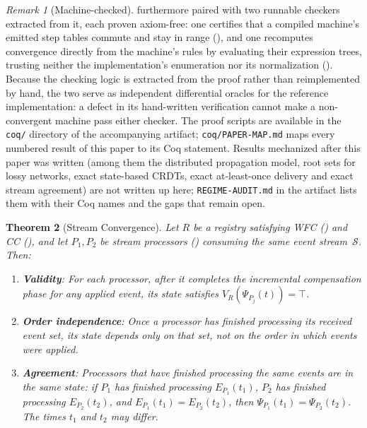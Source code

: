 \documentclass[11pt,a4paper]{article}
\theoremstyle{plain}
\newtheorem{theorem}{Theorem}[section]
\theoremstyle{definition}
\theoremstyle{remark}
\newtheorem{remark}[theorem]{Remark}
\begin{document}
\begin{remark}[Machine-checked]
furthermore paired with two runnable checkers extracted from it, each proven
axiom-free: one certifies that a compiled machine's emitted step tables
commute and stay in range (), and one recomputes
convergence directly from the machine's rules by evaluating their expression
trees, trusting neither the implementation's enumeration nor its
normalization ().  Because the checking logic is
extracted from the proof rather than reimplemented by hand, the two serve as
independent differential oracles for the reference implementation: a defect
in its hand-written verification cannot make a non-convergent machine pass
either checker.  The proof scripts are available in the \texttt{coq/}
directory of the accompanying artifact; \texttt{coq/PAPER-MAP.md} maps every
numbered result of this paper to its Coq statement.
Results mechanized after this paper was written (among them the distributed
propagation model, root sets for lossy networks, exact state-based CRDTs, exact
at-least-once delivery and exact stream agreement) are not written up here;
\texttt{REGIME-AUDIT.md} in the artifact lists them with their Coq names and
the gaps that remain open.
\end{remark}

\begin{theorem}[Stream Convergence]
\label{thm:convergence}
Let $R$ be a registry satisfying WFC () and CC
(), and let $P_1, P_2$ be stream processors
() consuming the same event stream~$\mathcal{S}$.
Then:
\begin{enumerate}[leftmargin=*,nosep,label=(\alph*)]
\item \textbf{Validity}: For each processor, after it completes the
  incremental compensation phase for any applied event, its state satisfies
  $V_R(\Psi_{P_j}(t)) = \top$.
\item \textbf{Order independence}: Once a processor has finished processing
  its received event set, its state depends only on that set, not on the
  order in which events were applied.
\item \textbf{Agreement}: Processors that have finished processing the same
  events are in the same state: if $P_1$ has finished processing
  $E_{P_1}(t_1)$, $P_2$ has finished processing $E_{P_2}(t_2)$, and
  $E_{P_1}(t_1) = E_{P_2}(t_2)$, then $\Psi_{P_1}(t_1) = \Psi_{P_2}(t_2)$.
  The times $t_1$ and $t_2$ may differ.
\end{enumerate}
\end{theorem}
\end{document}
